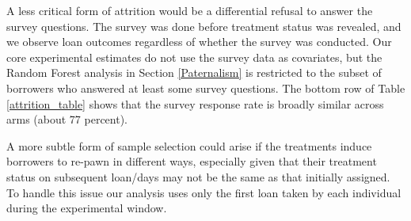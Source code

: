 \documentclass[oneside,11pt]{article}
\begin{document}
A less critical form of attrition would be a differential refusal to answer the survey questions.  The survey was done before treatment status was revealed, and we observe loan outcomes regardless of whether the survey was conducted.  Our core experimental estimates do not use the survey data as covariates, but the Random Forest analysis in Section \ref{Paternalism} is restricted to the subset of borrowers who answered at least some survey questions. The bottom row of Table \ref{attrition_table} shows that the survey response rate is broadly similar across arms (about 77 percent). 


A more subtle form of sample selection could arise if the treatments induce borrowers to re-pawn in different ways, especially given that their treatment status on subsequent loan/days may not be the same as that initially assigned.  To handle this issue our analysis uses only the first loan taken by each individual during the experimental window.  
\end{document}

